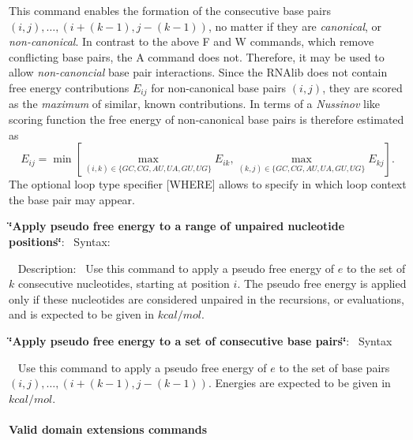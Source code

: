 \begin{DoxyEnumerate}
 This command enables the formation of the consecutive base pairs $ (i,j), \ldots, (i+(k-1), j-(k-1)) $, no matter if they are {\itshape canonical}, or {\itshape non-\/canonical}. In contrast to the above {\ttfamily F} and {\ttfamily W} commands, which remove conflicting base pairs, the {\ttfamily A} command does not. Therefore, it may be used to allow {\itshape non-\/canoncial} base pair interactions. Since the R\+N\+Alib does not contain free energy contributions $ E_{ij} $ for non-\/canonical base pairs $ (i,j) $, they are scored as the {\itshape maximum} of similar, known contributions. In terms of a {\itshape Nussinov} like scoring function the free energy of non-\/canonical base pairs is therefore estimated as \[ E_{ij} = \min \left[ \max_{(i,k) \in \{GC, CG, AU, UA, GU, UG\}} E_{ik}, \max_{(k,j) \in \{GC, CG, AU, UA, GU, UG\}} E_{kj} \right]. \] The optional loop type specifier {\ttfamily }\mbox{[}W\+H\+E\+RE\mbox{]} allows to specify in which loop context the base pair may appear.
\item {\bfseries{\char`\"{}\+Apply pseudo free energy to a range of unpaired nucleotide positions\char`\"{}}}\+:~\newline
 Syntax\+:
\begin{DoxyCode}{0}
\end{DoxyCode}
~\newline
 Description\+:~\newline
 Use this command to apply a pseudo free energy of $ e $ to the set of $ k $ consecutive nucleotides, starting at position $ i $. The pseudo free energy is applied only if these nucleotides are considered unpaired in the recursions, or evaluations, and is expected to be given in $ kcal / mol $.
\item {\bfseries{\char`\"{}\+Apply pseudo free energy to a set of consecutive base pairs\char`\"{}}}\+:~\newline
 Syntax
\begin{DoxyCode}{0}
\end{DoxyCode}
~\newline
 Use this command to apply a pseudo free energy of $ e $ to the set of base pairs $ (i,j), \ldots, (i+(k-1), j-(k-1)) $. Energies are expected to be given in $ kcal / mol $.
\end{DoxyEnumerate}\hypertarget{file_formats_domains_syntax}{}\paragraph{Valid domain extensions commands}\label{file_formats_domains_syntax}

